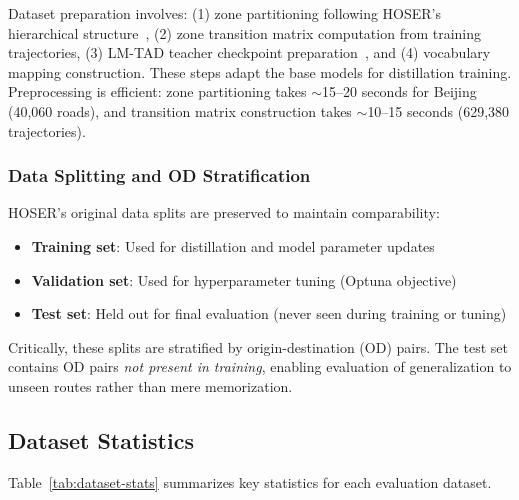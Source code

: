 Dataset preparation involves: (1) zone partitioning following HOSER's hierarchical structure~\cite{caoHolisticSemanticRepresentation2025}, (2) zone transition matrix computation from training trajectories, (3) LM-TAD teacher checkpoint preparation~\cite{mbuyaTrajectoryAnomalyDetection2024}, and (4) vocabulary mapping construction. These steps adapt the base models for distillation training. Preprocessing is efficient: zone partitioning takes $\sim$15--20 seconds for Beijing (40,060 roads), and transition matrix construction takes $\sim$10--15 seconds (629,380 trajectories).

\subsubsection{Data Splitting and OD Stratification}

HOSER's original data splits are preserved to maintain comparability:

\begin{itemize}[noitemsep,topsep=0pt]
\item \textbf{Training set}: Used for distillation and model parameter updates
\item \textbf{Validation set}: Used for hyperparameter tuning (Optuna objective)
\item \textbf{Test set}: Held out for final evaluation (never seen during training or tuning)
\end{itemize}

Critically, these splits are stratified by origin-destination (OD) pairs. The test set contains OD pairs \emph{not present in training}, enabling evaluation of generalization to unseen routes rather than mere memorization.

\subsection{Dataset Statistics}
\label{sec:data-stats}

Table~\ref{tab:dataset-stats} summarizes key statistics for each evaluation dataset.

